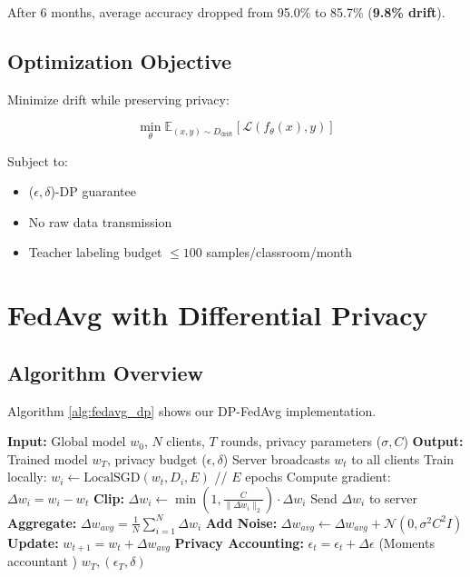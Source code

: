 \documentclass[conference]{IEEEtran}
\begin{document}
After 6 months, average accuracy dropped from 95.0\% to 85.7\% (\textbf{9.8\% drift}).

\subsection{Optimization Objective}

Minimize drift while preserving privacy:

\begin{equation}
\min_{\theta} \mathbb{E}_{(x,y) \sim D_{\text{drift}}} [\mathcal{L}(f_\theta(x), y)]
\end{equation}

Subject to:
\begin{itemize}
    \item ($\epsilon, \delta$)-DP guarantee
    \item No raw data transmission
    \item Teacher labeling budget $\leq 100$ samples/classroom/month
\end{itemize}

\section{FedAvg with Differential Privacy}

\subsection{Algorithm Overview}

Algorithm \ref{alg:fedavg_dp} shows our DP-FedAvg implementation.

\begin{algorithm}[h]
\caption{FedAvg with Differential Privacy}
\label{alg:fedavg_dp}
\begin{algorithmic}[1]
\STATE \textbf{Input:} Global model $w_0$, $N$ clients, $T$ rounds, privacy parameters ($\sigma, C$)
\STATE \textbf{Output:} Trained model $w_T$, privacy budget ($\epsilon, \delta$)
    \STATE Server broadcasts $w_t$ to all clients
        \STATE Train locally: $w_i \leftarrow \text{LocalSGD}(w_t, D_i, E)$ // $E$ epochs
        \STATE Compute gradient: $\Delta w_i = w_i - w_t$
        \STATE \textbf{Clip:} $\Delta w_i \leftarrow \min(1, \frac{C}{\|\Delta w_i\|_2}) \cdot \Delta w_i$
        \STATE Send $\Delta w_i$ to server
    \ENDFOR
    \STATE \textbf{Aggregate:} $\Delta w_{avg} = \frac{1}{N}\sum_{i=1}^{N} \Delta w_i$
    \STATE \textbf{Add Noise:} $\Delta w_{avg} \leftarrow \Delta w_{avg} + \mathcal{N}(0, \sigma^2 C^2 I)$
    \STATE \textbf{Update:} $w_{t+1} = w_t + \Delta w_{avg}$
    \STATE \textbf{Privacy Accounting:} $\epsilon_t = \epsilon_t + \Delta \epsilon$ (Moments accountant \cite{abadi2016})
\ENDFOR
\RETURN $w_T, (\epsilon_T, \delta)$
\end{algorithmic}
\end{algorithm}
\end{document}
